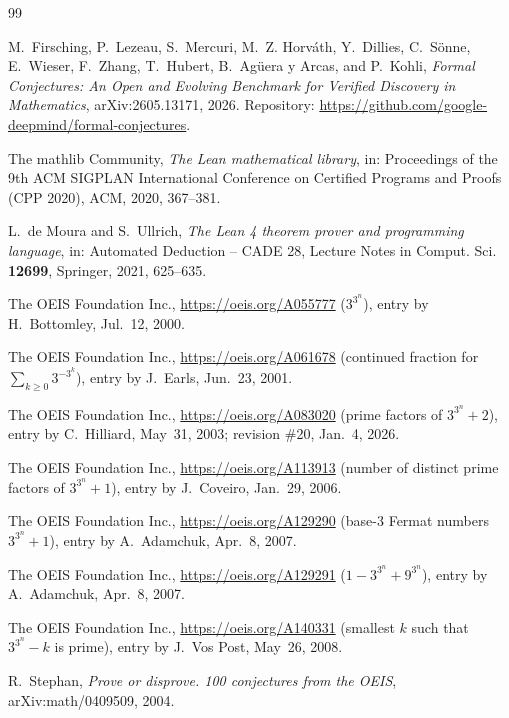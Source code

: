 \documentclass[11pt]{amsart}
\theoremstyle{plain}
\theoremstyle{definition}
\begin{document}
{\small
\begin{thebibliography}{99}

M.~Firsching, P.~Lezeau, S.~Mercuri, M.~Z. Horv\'ath, Y.~Dillies, C.~S\"onne, E.~Wieser, F.~Zhang, T.~Hubert, B.~Ag\"uera y Arcas, and P.~Kohli, \emph{Formal Conjectures: An Open and Evolving Benchmark for Verified Discovery in Mathematics}, arXiv:2605.13171, 2026. Repository: \url{https://github.com/google-deepmind/formal-conjectures}.

The mathlib Community, \emph{The Lean mathematical library}, in: Proceedings of the 9th ACM SIGPLAN International Conference on Certified Programs and Proofs (CPP 2020), ACM, 2020, 367--381.

L.~de Moura and S.~Ullrich, \emph{The Lean 4 theorem prover and programming language}, in: Automated Deduction -- CADE 28, Lecture Notes in Comput. Sci. \textbf{12699}, Springer, 2021, 625--635.

The OEIS Foundation Inc., \url{https://oeis.org/A055777} ($3^{3^n}$), entry by H.~Bottomley, Jul.~12, 2000.

The OEIS Foundation Inc., \url{https://oeis.org/A061678} (continued fraction for $\sum_{k\ge0}3^{-3^k}$), entry by J.~Earls, Jun.~23, 2001.

The OEIS Foundation Inc., \url{https://oeis.org/A083020} (prime factors of $3^{3^n}+2$), entry by C.~Hilliard, May~31, 2003; revision \#20, Jan.~4, 2026.

The OEIS Foundation Inc., \url{https://oeis.org/A113913} (number of distinct prime factors of $3^{3^n}+1$), entry by J.~Coveiro, Jan.~29, 2006.

The OEIS Foundation Inc., \url{https://oeis.org/A129290} (base-$3$ Fermat numbers $3^{3^n}+1$), entry by A.~Adamchuk, Apr.~8, 2007.

The OEIS Foundation Inc., \url{https://oeis.org/A129291} ($1-3^{3^n}+9^{3^n}$), entry by A.~Adamchuk, Apr.~8, 2007.

The OEIS Foundation Inc., \url{https://oeis.org/A140331} (smallest $k$ such that $3^{3^n}-k$ is prime), entry by J.~Vos Post, May~26, 2008.

R.~Stephan, \emph{Prove or disprove. 100 conjectures from the OEIS}, arXiv:math/0409509, 2004.

\end{thebibliography}
}
\end{document}
